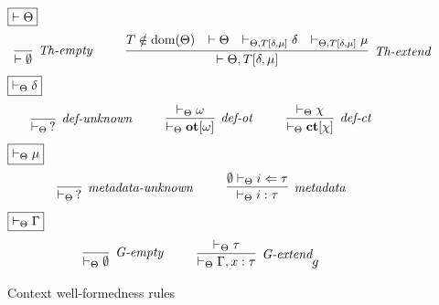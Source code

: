 \begin{figure}[h]
$\fbox{$\vdash \Theta$}$
\[
\begin{array}{c}
\infer[\textit{Th-empty}]
{\vdash \emptyset}
{ }
~~~~~~~~
\infer[\textit{Th-extend}]
{\vdash \Theta, T[\delta, \mu]}
{T \notin \text{dom}(\Theta) & \vdash \Theta & \vdash_{\Theta, T[\delta, \mu]} \delta &
\vdash_{\Theta, T[\delta, \mu]} \mu}
\end{array}
\]
$\fbox{$\vdash_\Theta \delta$}$
\[
\begin{array}{c}
\infer[\textit{def-unknown}]
{\vdash_\Theta\,?}
{ }
~~~~~~~~
\infer[\textit{def-ot}]
{\vdash_\Theta \keyw{ot}[\omega]}
{\vdash_\Theta \omega}
~~~~~~~~
\infer[\textit{def-ct}]
{\vdash_\Theta \keyw{ct}[\chi]}
{\vdash_\Theta \chi}
\end{array}
\]
$\fbox{$\vdash_\Theta \mu$}$
\[
\begin{array}{c}
\infer[\textit{metadata-unknown}]
{\vdash_\Theta\,?}
{ }
~~~~~~~~
\infer[\textit{metadata}]
{\vdash_\Theta i : \tau}
{\emptyset \vdash_\Theta i \Leftarrow \tau}
\end{array}
\]
$\fbox{$\vdash_\Theta \Gamma$}$
\[
\begin{array}{c}
\infer[\textit{G-empty}]
{\vdash_\Theta \emptyset}
{ }
~~~~~~~~
\infer[\textit{G-extend}]
{\vdash_\Theta \Gamma, x : \tau}
{\vdash_\Theta \tau}g
\end{array}
\]
\caption{Context well-formedness rules}
\end{figure}
\newpage
